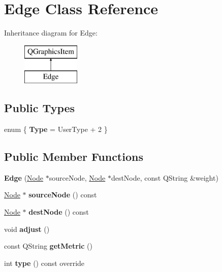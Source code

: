 \hypertarget{class_edge}{}\section{Edge Class Reference}
\label{class_edge}
Inheritance diagram for Edge\+:\begin{figure}[H]
\begin{center}
\leavevmode
\includegraphics[height=2.000000cm]{class_edge}
\end{center}
\end{figure}
\subsection*{Public Types}
\begin{DoxyCompactItemize}
\item 
\mbox{\label{class_edge_a1076c24a9c10f5e019ee362060200329}} 
enum \{ {\bfseries Type} = User\+Type + 2
 \}
\end{DoxyCompactItemize}
\subsection*{Public Member Functions}
\begin{DoxyCompactItemize}
\item 
\mbox{\label{class_edge_a8b4c1a1e1e0982f3ece5cdafd1dedba9}} 
{\bfseries Edge} (\mbox{\hyperlink{class_node}{Node}} $\ast$source\+Node, \mbox{\hyperlink{class_node}{Node}} $\ast$dest\+Node, const Q\+String \&weight)
\item 
\mbox{\label{class_edge_aa620dd494d9ad75a10e2800407478097}} 
\mbox{\hyperlink{class_node}{Node}} $\ast$ {\bfseries source\+Node} () const
\item 
\mbox{\label{class_edge_a3c9de73a06f270ffc6d3a6ff2ba5d4c6}} 
\mbox{\hyperlink{class_node}{Node}} $\ast$ {\bfseries dest\+Node} () const
\item 
\mbox{\label{class_edge_ab554a765fd7a57fcdf289aa51b4df328}} 
void {\bfseries adjust} ()
\item 
\mbox{\label{class_edge_aca790c4dd9998dadaefa60fdf99761c2}} 
const Q\+String {\bfseries get\+Metric} ()
\item 
\mbox{\label{class_edge_a9ae46eb35e91e2253434274458aaec55}} 
int {\bfseries type} () const override
\end{DoxyCompactItemize}
